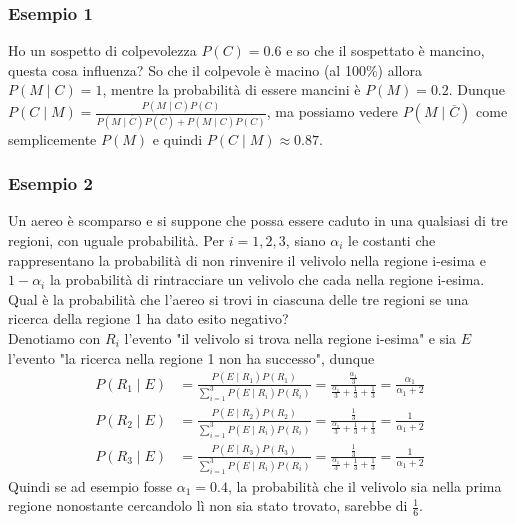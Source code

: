\documentclass[11pt]{report}
\begin{document}
\subsubsection{Esempio 1}
Ho un sospetto di colpevolezza $P(C) = 0.6$ e so che il sospettato è mancino, questa cosa influenza? So che il colpevole è macino (al 100\%) allora $P(M \mid C) = 1$, mentre la probabilità di essere mancini è $P(M) = 0.2$. Dunque $P(C \mid M) = \frac{P(M \mid C)P(C)}{P(M \mid \overline{C})P(\overline{C}) + P(M \mid C)P(C)}$, ma possiamo vedere $P(M \mid \overline{C})$ come semplicemente $P(M)$ e quindi $P(C \mid M) \approx 0.87$.
\subsubsection{Esempio 2}
Un aereo è scomparso e si suppone che possa essere caduto in una qualsiasi di tre regioni, con uguale probabilità. Per $i = 1,2,3$, siano $\alpha_i$ le costanti che rappresentano la probabilità di non rinvenire il velivolo nella regione i-esima e $1 - \alpha_i$ la probabilità di rintracciare un velivolo che cada nella regione i-esima. Qual è la probabilità che l'aereo si trovi in ciascuna delle tre regioni se una ricerca della regione 1 ha dato esito negativo?\\
Denotiamo con $R_i$ l'evento "il velivolo si trova nella regione i-esima" e sia $E$ l'evento "la ricerca nella regione 1 non ha successo", dunque
\begin{equation}
    \begin{split}
        P(R_1 \mid E) & = \frac{P(E \mid R_1)P(R_1)}{\sum_{i=1}^{3}P(E \mid R_i)P(R_i)} = \frac{\frac{\alpha_1}{3}}{\frac{\alpha_1}{3} + \frac{1}{3} + \frac{1}{3}} = \frac{\alpha_1}{\alpha_1 + 2}\\
        P(R_2 \mid E) & = \frac{P(E \mid R_2)P(R_2)}{\sum_{i=1}^{3}P(E \mid R_i)P(R_i)} = \frac{\frac{1}{3}}{\frac{\alpha_1}{3} + \frac{1}{3} + \frac{1}{3}} = \frac{1}{\alpha_1 + 2}\\
        P(R_3 \mid E) & = \frac{P(E \mid R_3)P(R_3)}{\sum_{i=1}^{3}P(E \mid R_i)P(R_i)} = \frac{\frac{1}{3}}{\frac{\alpha_1}{3} + \frac{1}{3} + \frac{1}{3}} = \frac{1}{\alpha_1 + 2}
    \end{split}
\end{equation}
Quindi se ad esempio fosse $\alpha_1 = 0.4$, la probabilità che il velivolo sia nella prima regione nonostante cercandolo lì non sia stato trovato, sarebbe di $\frac{1}{6}$.
\end{document}
